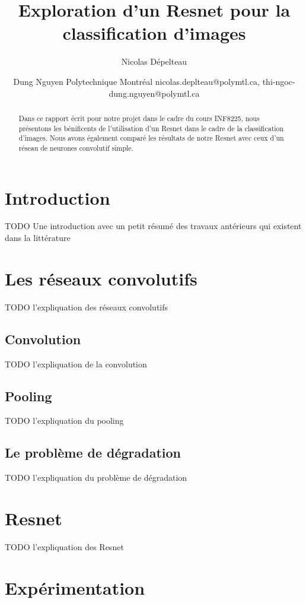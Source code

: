 \documentclass{article}
\title{Exploration d'un Resnet pour la classification d'images}
\author{
Nicolas Dépelteau
\and
Dung Nguyen
\affiliations
Polytechnique Montréal
\emails
nicolas.deplteau@polymtl.ca,
thi-ngoc-dung.nguyen@polymtl.ca

}
\begin{document}
\maketitle

\begin{abstract}
    Dans ce rapport écrit pour notre projet dans le cadre du cours INF8225,
    nous présentons les bénificents de l'utilisation
    d'un Resnet dans le cadre de la classification d'images. Nous avons également comparé les
    résultats de notre Resnet avec ceux d'un réseau de neurones convolutif simple. 
\end{abstract}

\section{Introduction}

TODO Une introduction avec un petit résumé des travaux antérieurs qui existent dans la littérature

\section{Les réseaux convolutifs}

TODO l'expliquation des réseaux convolutifs
\subsection{Convolution}

TODO l'expliquation de la convolution

\subsection{Pooling}

TODO l'expliquation du pooling
\subsection{Le problème  de dégradation}

TODO l'expliquation du problème de dégradation
\section{Resnet}

TODO l'expliquation des Resnet

\section{Expérimentation}
\end{document}
